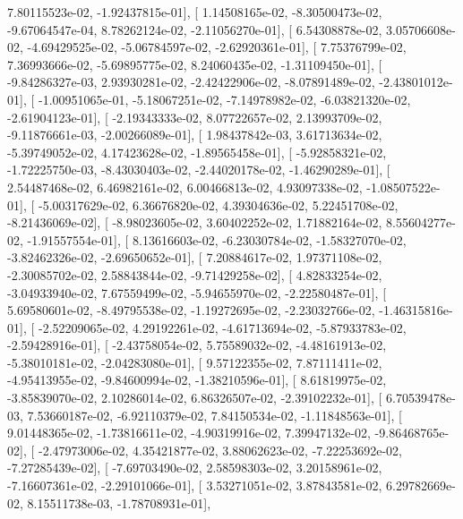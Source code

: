 \documentclass{article}
\begin{document}
          7.80115523e-02,  -1.92437815e-01],
       [  1.14508165e-02,  -8.30500473e-02,  -9.67064547e-04,
          8.78262124e-02,  -2.11056270e-01],
       [  6.54308878e-02,   3.05706608e-02,  -4.69429525e-02,
         -5.06784597e-02,  -2.62920361e-01],
       [  7.75376799e-02,   7.36993666e-02,  -5.69895775e-02,
          8.24060435e-02,  -1.31109450e-01],
       [ -9.84286327e-03,   2.93930281e-02,  -2.42422906e-02,
         -8.07891489e-02,  -2.43801012e-01],
       [ -1.00951065e-01,  -5.18067251e-02,  -7.14978982e-02,
         -6.03821320e-02,  -2.61904123e-01],
       [ -2.19343333e-02,   8.07722657e-02,   2.13993709e-02,
         -9.11876661e-03,  -2.00266089e-01],
       [  1.98437842e-03,   3.61713634e-02,  -5.39749052e-02,
          4.17423628e-02,  -1.89565458e-01],
       [ -5.92858321e-02,  -1.72225750e-03,  -8.43030403e-02,
         -2.44020178e-02,  -1.46290289e-01],
       [  2.54487468e-02,   6.46982161e-02,   6.00466813e-02,
          4.93097338e-02,  -1.08507522e-01],
       [ -5.00317629e-02,   6.36676820e-02,   4.39304636e-02,
          5.22451708e-02,  -8.21436069e-02],
       [ -8.98023605e-02,   3.60402252e-02,   1.71882164e-02,
          8.55604277e-02,  -1.91557554e-01],
       [  8.13616603e-02,  -6.23030784e-02,  -1.58327070e-02,
         -3.82462326e-02,  -2.69650652e-01],
       [  7.20884617e-02,   1.97371108e-02,  -2.30085702e-02,
          2.58843844e-02,  -9.71429258e-02],
       [  4.82833254e-02,  -3.04933940e-02,   7.67559499e-02,
         -5.94655970e-02,  -2.22580487e-01],
       [  5.69580601e-02,  -8.49795538e-02,  -1.19272695e-02,
         -2.23032766e-02,  -1.46315816e-01],
       [ -2.52209065e-02,   4.29192261e-02,  -4.61713694e-02,
         -5.87933783e-02,  -2.59428916e-01],
       [ -2.43758054e-02,   5.75589032e-02,  -4.48161913e-02,
         -5.38010181e-02,  -2.04283080e-01],
       [  9.57122355e-02,   7.87111411e-02,  -4.95413955e-02,
         -9.84600994e-02,  -1.38210596e-01],
       [  8.61819975e-02,  -3.85839070e-02,   2.10286014e-02,
          6.86326507e-02,  -2.39102232e-01],
       [  6.70539478e-03,   7.53660187e-02,  -6.92110379e-02,
          7.84150534e-02,  -1.11848563e-01],
       [  9.01448365e-02,  -1.73816611e-02,  -4.90319916e-02,
          7.39947132e-02,  -9.86468765e-02],
       [ -2.47973006e-02,   4.35421877e-02,   3.88062623e-02,
         -7.22253692e-02,  -7.27285439e-02],
       [ -7.69703490e-02,   2.58598303e-02,   3.20158961e-02,
         -7.16607361e-02,  -2.29101066e-01],
       [  3.53271051e-02,   3.87843581e-02,   6.29782669e-02,
          8.15511738e-03,  -1.78708931e-01],
\end{document}
